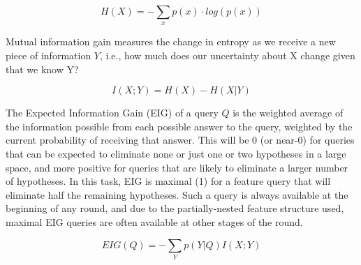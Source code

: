 \documentclass[10pt,letterpaper]{article}
\begin{document}
\begin{equation}
  H(X) = -\sum_{x} p(x) \cdot log(p(x))
\end{equation}

Mutual information gain measures the change in entropy as we receive a new piece 
of information $Y$, i.e., how much does our uncertainty about X change given that 
we know Y?

\begin{equation}
  I(X;Y) = H(X) - H(X|Y)
\end{equation}

The Expected Information Gain (EIG) of a query $Q$ is the weighted average of the 
information possible from each possible answer to the query, weighted by the 
current probability of receiving that answer. This will be 0 (or near-0) for queries that 
can be expected to eliminate none or just one or two hypotheses in a large space, 
and more positive for queries that are likely to eliminate a larger number of 
hypotheses. In this task, EIG is maximal (1) for a feature query that will eliminate 
half the remaining hypotheses. Such a query is always available at the beginning of 
any round, and due to the partially-nested feature structure used, maximal EIG 
queries are often available at other stages of the round.

\begin{equation}
  EIG(Q) = -\sum_{Y} p(Y|Q) I(X;Y)
\end{equation}
\end{document}
